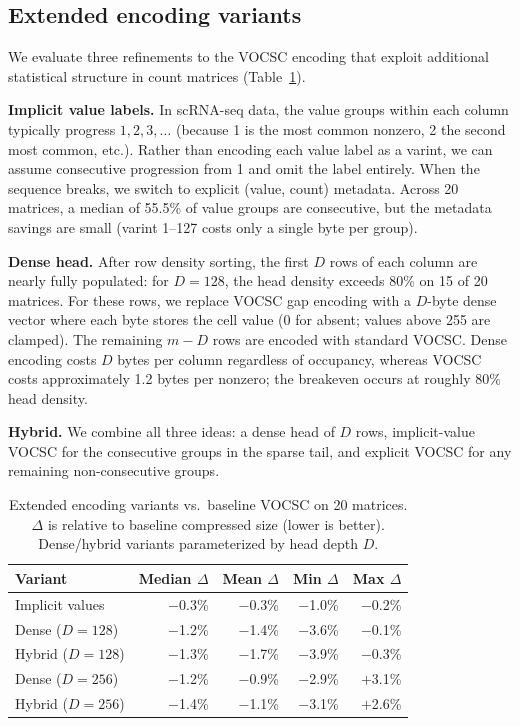 \documentclass[10pt,twocolumn,letterpaper]{article}
\begin{document}
\subsection{Extended encoding variants}
\label{sec:extended}

We evaluate three refinements to the VOCSC encoding that exploit additional statistical structure in count matrices (Table~\ref{tab:extended}).

\textbf{Implicit value labels.}
In scRNA-seq data, the value groups within each column typically progress $1, 2, 3, \ldots$ (because 1 is the most common nonzero, 2 the second most common, etc.).
Rather than encoding each value label as a varint, we can assume consecutive progression from 1 and omit the label entirely.
When the sequence breaks, we switch to explicit (value, count) metadata.
Across 20 matrices, a median of 55.5\% of value groups are consecutive, but the metadata savings are small (varint 1--127 costs only a single byte per group).

\textbf{Dense head.}
After row density sorting, the first $D$ rows of each column are nearly fully populated: for $D = 128$, the head density exceeds 80\% on 15 of 20 matrices.
For these rows, we replace VOCSC gap encoding with a $D$-byte dense vector where each byte stores the cell value (0 for absent; values above 255 are clamped).
The remaining $m - D$ rows are encoded with standard VOCSC.
Dense encoding costs $D$ bytes per column regardless of occupancy, whereas VOCSC costs approximately 1.2 bytes per nonzero; the breakeven occurs at roughly 80\% head density.

\textbf{Hybrid.}
We combine all three ideas: a dense head of $D$ rows, implicit-value VOCSC for the consecutive groups in the sparse tail, and explicit VOCSC for any remaining non-consecutive groups.

\begin{table}[t]
\centering
\caption{Extended encoding variants vs.\ baseline VOCSC on 20 matrices. $\Delta$ is relative to baseline compressed size (lower is better). Dense/hybrid variants parameterized by head depth $D$.}
\label{tab:extended}
\footnotesize
\begin{tabular}{lrrrr}
\toprule
Variant & Median $\Delta$ & Mean $\Delta$ & Min $\Delta$ & Max $\Delta$ \\
\midrule
Implicit values    & $-$0.3\% & $-$0.3\% & $-$1.0\% & $-$0.2\% \\
Dense ($D{=}128$)  & $-$1.2\% & $-$1.4\% & $-$3.6\% & $-$0.1\% \\
Hybrid ($D{=}128$) & $-$1.3\% & $-$1.7\% & $-$3.9\% & $-$0.3\% \\
\midrule
Dense ($D{=}256$)  & $-$1.2\% & $-$0.9\% & $-$2.9\% & $+$3.1\% \\
Hybrid ($D{=}256$) & $-$1.4\% & $-$1.1\% & $-$3.1\% & $+$2.6\% \\
\bottomrule
\end{tabular}
\end{table}
\end{document}
